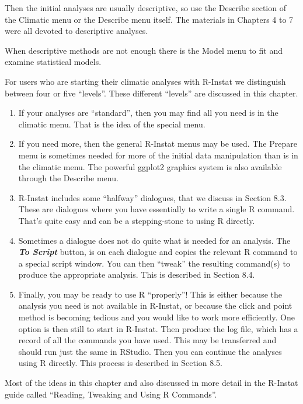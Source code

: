 \documentclass[
  letterpaper,
  DIV=11,
  numbers=noendperiod]{scrreprt}
\begin{document}
Then the initial analyses are usually descriptive, so use the Describe
section of the Climatic menu or the Describe menu itself. The materials
in Chapters 4 to 7 were all devoted to descriptive analyses.

When descriptive methods are not enough there is the Model menu to fit
and examine statistical models.

For users who are starting their climatic analyses with R-Instat we
distinguish between four or five ``levels''. These different ``levels''
are discussed in this chapter.

\begin{enumerate}
\def\labelenumi{\arabic{enumi}.}
\item
  If your analyses are ``standard'', then you may find all you need is
  in the climatic menu. That is the idea of the special menu.
\item
  If you need more, then the general R-Instat menus may be used. The
  Prepare menu is sometimes needed for more of the initial data
  manipulation than is in the climatic menu. The powerful ggplot2
  graphics system is also available through the Describe menu.
\item
  R-Instat includes some ``halfway'' dialogues, that we discuss in
  Section 8.3. These are dialogues where you have essentially to write a
  single R command. That's quite easy and can be a stepping-stone to
  using R directly.
\item
  Sometimes a dialogue does not do quite what is needed for an analysis.
  The \textbf{\emph{To Script}} button, is on each dialogue and copies
  the relevant R command to a special script window. You can then
  ``tweak'' the resulting command(s) to produce the appropriate
  analysis. This is described in Section 8.4.
\item
  Finally, you may be ready to use R ``properly''! This is either
  because the analysis you need is not available in R-Instat, or because
  the click and point method is becoming tedious and you would like to
  work more efficiently. One option is then still to start in R-Instat.
  Then produce the log file, which has a record of all the commands you
  have used. This may be transferred and should run just the same in
  RStudio. Then you can continue the analyses using R directly. This
  process is described in Section 8.5.
\end{enumerate}

Most of the ideas in this chapter and also discussed in more detail in
the R-Instat guide called ``Reading, Tweaking and Using R Commands''.
\end{document}
